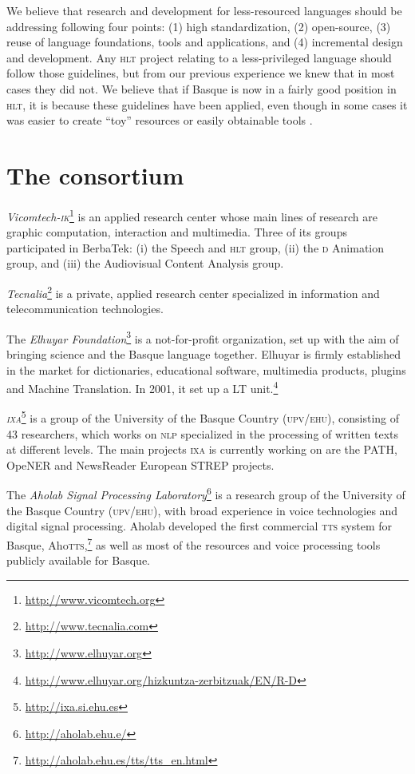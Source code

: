 \documentclass[output=paper]{LSP/langsci}
\begin{document}
We believe that research and development for less-resourced languages should be addressing following four points: (1) high standardization, (2) open-source, (3) reuse of language foundations, tools and applications, and (4) incremental design and development. Any \textsc{hlt} project relating to a less-privileged language should follow those guidelines, but from our previous experience we knew that in most cases they did not. We believe that if Basque is now in a fairly good position in \textsc{hlt}, it is because these guidelines have been applied, even though in some cases it was easier to create ``toy'' resources or easily obtainable tools \citep{AlegriaEtAl2011}.

\section{The consortium}\label{sec:leturia:2}

\textit{Vicomtech-\textsc{ik}}\footnote{\url{http://www.vicomtech.org}} is an applied research center whose main lines of research are graphic computation, interaction and multimedia. Three of its groups participated in BerbaTek: (i) the Speech and \textsc{hlt} group, (ii) the \textsc{d} Animation group, and (iii) the Audiovisual Content Analysis group.

\textit{Tecnalia}\footnote{\url{http://www.tecnalia.com}} is a private, applied research center specialized in information and telecommunication technologies.

The \textit{Elhuyar Foundation}\footnote{\url{http://www.elhuyar.org}} is a not-for-profit organization, set up with the aim of bringing science and the Basque language together. Elhuyar is firmly established in the market for dictionaries, educational software, multimedia products, plugins and Machine Translation. In 2001, it set up a LT unit.\footnote{\url{http://www.elhuyar.org/hizkuntza-zerbitzuak/EN/R-D}}

\textit{\textsc{ixa}}\footnote{\url{http://ixa.si.ehu.es}} is a group of the University of the Basque Country (\textsc{upv\slash ehu}), consisting of 43 researchers, which works on \textsc{nlp} specialized in the processing of written texts at different levels. The main projects \textsc{ixa} is currently working on are the PATH, OpeNER and NewsReader European STREP projects.

The \textit{Aholab Signal Processing Laboratory}\footnote{\url{http://aholab.ehu.e/}} is a research group of the University of the Basque Country (\textsc{upv\slash ehu}), with broad experience in voice technologies and digital signal processing. Aholab developed the first commercial \textsc{tts} system for Basque, Aho\textsc{tts},\footnote{\url{http://aholab.ehu.es/tts/tts_en.html}} as well as most of the resources and voice processing tools publicly available for Basque.
\end{document}
